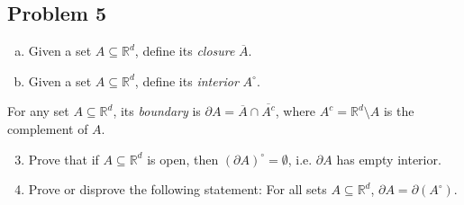 \documentclass[12pt]{article}
\newcommand{\real}{\mathbb{R}}
\newcommand{\ita}[1]{\textit{#1}}
\newcommand\paren[1]{\left( #1 \right)}
\theoremstyle{definition}
\begin{document}
\subsection{Problem 5}
\begin{enumerate}[(a)]
    \item Given a set $A \subseteq \real^d$, define its \ita{closure} $\overline{A}$.
    \item Given a set $A \subseteq \real^d$, define its \ita{interior} $A^{\circ}$. 
\end{enumerate}
For any set $A \subseteq \real^d$, its \ita{boundary} is $\partial A = \overline{A} \cap \overline{A^c}$, where $A^c = \real^d \setminus A$ is the complement of $A$.
\begin{enumerate}
    \setcounter{enumi}{2}
    \item Prove that if $A \subseteq \real^d$ is open, then $(\partial A)^{\circ} = \emptyset$, i.e. $\partial A$ has empty interior. 
    \item Prove or disprove the following statement: For all sets $A \subseteq \real^d$, $\partial A = \partial \paren{ A^{\circ} }$. 
\end{enumerate}
\end{document}
